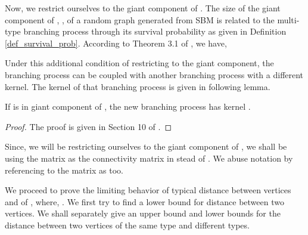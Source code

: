 \documentclass[graybox]{svmult}
\begin{document}
Now, we restrict ourselves to the giant component of . The size of the giant component of , , of a random graph generated from SBM is related to the multi-type branching process through its survival probability as given in Definition \ref{def_survival_prob}. According to Theorem 3.1 of \cite{bollobas2007phase}, we have,

Under this additional condition of restricting to the giant component, the branching process can be coupled with another branching process with a different kernel. The kernel of that branching process is given in following lemma.
\begin{lemma}
\label{lemma_brpr_cond}
If  is in giant component of , the new branching process has kernel . 
\end{lemma}
\begin{proof}
The proof is given in Section 10 of \cite{bollobas2007phase}.
\end{proof}
Since, we will be restricting ourselves to the giant component of , we shall be using the  matrix as the connectivity matrix in stead of . We abuse notation by referencing to the matrix  as  too.

We proceed to prove the limiting behavior of typical distance between vertices  and  of , where, . We first try to find a lower bound for distance between two vertices. We shall separately give an upper bound and lower bounds for the distance between two vertices of the same type and different types. 
\end{document}

